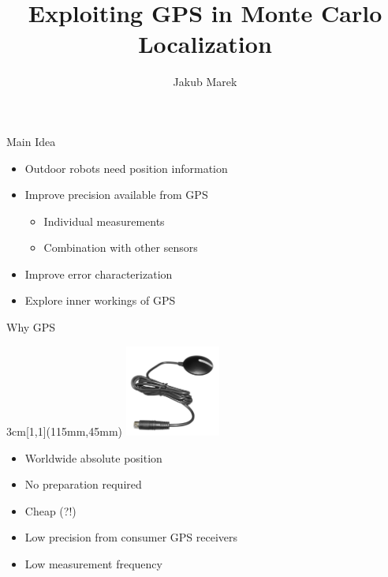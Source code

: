\documentclass[utf8,12pt]{beamer}
\title{Exploiting GPS in Monte Carlo Localization}
\author{Jakub Marek}
\newcommand{\imageframe}[3]{{
\setbeamertemplate{background}{
    \vbox to \paperheight{\vfil\hbox to \paperwidth{\hfil
    \texttt{[image: \#1]} %
    \hfil}\vfil}
    }
\setbeamercolor{background canvas}{bg=#2}
\begin{frame}[plain]
\end{frame}
}}
\begin{document}
\begin{frame}[plain]
    \titlepage
\end{frame}

\begin{frame}{Main Idea}
    \begin{itemize}
        \item Outdoor robots need position information
    \end{itemize}
    \begin{itemize}
        \item Improve precision available from GPS
        \begin{itemize}
            \item Individual measurements
            \item Combination with other sensors
        \end{itemize}
        \item Improve error characterization
        \item Explore inner workings of GPS
    \end{itemize}
\end{frame}


\begin{frame}{Why GPS}
    \begin{textblock*}{3cm}[1,1](115mm,45mm)
        \includegraphics[height=3cm]{img/receiver.jpg}
    \end{textblock*}
    \begin{itemize}
        \item Worldwide absolute position
        \item No preparation required
        \item Cheap (?!)
    \end{itemize}
    \vspace{0.5cm}
    \begin{itemize}
        \item Low precision from consumer GPS receivers
        \item Low measurement frequency
    \end{itemize}
\end{frame}
\end{document}
